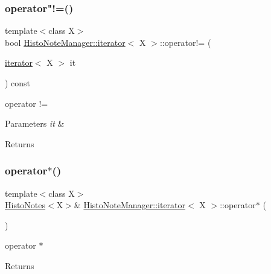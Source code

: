 \subsubsection{\texorpdfstring{operator"!=()}{operator!=()}}
{\footnotesize\ttfamily template$<$class X$>$ \\
bool \hyperlink{class_histo_note_manager_1_1iterator}{Histo\+Note\+Manager\+::iterator}$<$ X $>$\+::operator!= (\begin{DoxyParamCaption}\item[{\hyperlink{class_histo_note_manager_1_1iterator}{iterator}$<$ X $>$}]{it }\end{DoxyParamCaption}) const\hspace{0.3cm}{\ttfamily [inline]}}



operator != 


\begin{DoxyParams}{Parameters}
{\em it} & \\
\hline
\end{DoxyParams}
\begin{DoxyReturn}{Returns}

\end{DoxyReturn}
\mbox{\label{class_histo_note_manager_1_1iterator_a9069f8396167a1e36d0b018403a49ab6}} 
\subsubsection{\texorpdfstring{operator$\ast$()}{operator*()}}
{\footnotesize\ttfamily template$<$class X$>$ \\
\hyperlink{class_histo_notes}{Histo\+Notes}$<$X$>$\& \hyperlink{class_histo_note_manager_1_1iterator}{Histo\+Note\+Manager\+::iterator}$<$ X $>$\+::operator$\ast$ (\begin{DoxyParamCaption}{ }\end{DoxyParamCaption})\hspace{0.3cm}{\ttfamily [inline]}}



operator $\ast$ 

\begin{DoxyReturn}{Returns}

\end{DoxyReturn}
\mbox{\label{class_histo_note_manager_1_1iterator_a8154f56529c02508425568db0cecccaf}} 
